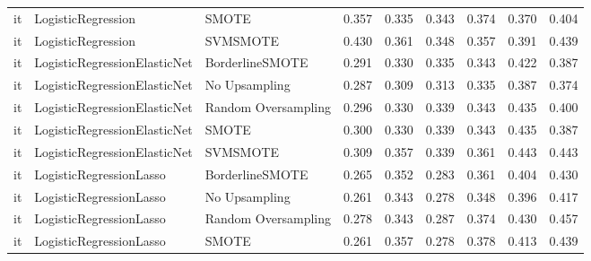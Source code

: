 \begin{tabular}{lllllllll}
      it &           LogisticRegression &               SMOTE & 0.357 &                     0.335 &                 0.343 &                  0.374 &                                   0.370 &     0.404 \\
      it &           LogisticRegression &            SVMSMOTE & 0.430 &                     0.361 &                 0.348 &                  0.357 &                                   0.391 &     0.439 \\
      it & LogisticRegressionElasticNet &     BorderlineSMOTE & 0.291 &                     0.330 &                 0.335 &                  0.343 &                                   0.422 &     0.387 \\
      it & LogisticRegressionElasticNet &       No Upsampling & 0.287 &                     0.309 &                 0.313 &                  0.335 &                                   0.387 &     0.374 \\
      it & LogisticRegressionElasticNet & Random Oversampling & 0.296 &                     0.330 &                 0.339 &                  0.343 &                                   0.435 &     0.400 \\
      it & LogisticRegressionElasticNet &               SMOTE & 0.300 &                     0.330 &                 0.339 &                  0.343 &                                   0.435 &     0.387 \\
      it & LogisticRegressionElasticNet &            SVMSMOTE & 0.309 &                     0.357 &                 0.339 &                  0.361 &                                   0.443 &     0.443 \\
      it &      LogisticRegressionLasso &     BorderlineSMOTE & 0.265 &                     0.352 &                 0.283 &                  0.361 &                                   0.404 &     0.430 \\
      it &      LogisticRegressionLasso &       No Upsampling & 0.261 &                     0.343 &                 0.278 &                  0.348 &                                   0.396 &     0.417 \\
      it &      LogisticRegressionLasso & Random Oversampling & 0.278 &                     0.343 &                 0.287 &                  0.374 &                                   0.430 &     0.457 \\
      it &      LogisticRegressionLasso &               SMOTE & 0.261 &                     0.357 &                 0.278 &                  0.378 &                                   0.413 &     0.439 \\

\end{tabular}
